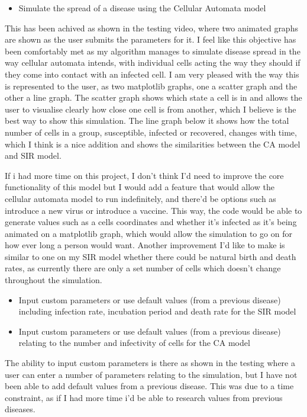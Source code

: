 \documentclass[11pt, a4paper]{article}
\begin{document}
\begin{itemize}
    \item Simulate the spread of a disease using the Cellular Automata model
\end{itemize}
This has been achived as shown in the testing video, where two animated graphs are shown as the user submits the parameters for it. I feel like this objective has been comfortably met as my algorithm manages to simulate disease spread in the way cellular automata intends, with individual cells acting the way they should if they come into contact with an infected cell. I am very pleased with the way this is represented to the user, as two matplotlib graphs, one a scatter graph and the other a line graph. The scatter graph shows which state a cell is in and allows the user to visualise clearly how close one cell is from another, which I believe is the best way to show this simulation. The line graph below it shows how the total number of cells in a group, susceptible, infected or recovered, changes with time, which I think is a nice addition and shows the similarities between the CA model and SIR model.

If i had more time on this project, I don't think I'd need to improve the core functionality of this model but I would add a feature that would allow the cellular automata model to run indefinitely, and there'd be options such as introduce a new virus or introduce a vaccine. This way, the code would be able to generate values such as a cells coordinates and whether it's infected as it's being animated on a matplotlib graph, which would allow the simulation to go on for how ever long a person would want. Another improvement I'd like to make is similar to one on my SIR model whether there could be natural birth and death rates, as currently there are only a set number of cells which doesn't change throughout the simulation.

\begin{itemize}
    \item Input custom parameters or use default values (from a previous disease) including infection rate, incubation period and death rate for the SIR model
    \item Input custom parameters or use default values (from a previous disease) relating to the number and infectivity of cells for the CA model
\end{itemize}
The ability to input custom parameters is there as shown in the testing where a user can enter a number of parameters relating to the simulation, but I have not been able to add default values from a previous disease. This was due to a time constraint, as if I had more time i'd be able to research values from previous diseases.
\end{document}

